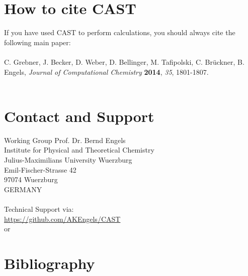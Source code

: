 \documentclass[10pt,a4paper]{article} %
\begin{document}
	\section{How to cite CAST}

	If you have used \ac{CAST} to perform calculations, you should always cite the following main paper:\\~\\
	C. Grebner, J. Becker, D. Weber, D. Bellinger, M. Tafipolski, C. Br\"uckner,
	B. Engels, \textit{Journal of Computational Chemistry} \textbf{2014}, \textit{35}, 1801-1807.~\\~\\
	

	\newpage
	\section{Contact and Support}
	\label{sec:contact}

	Working Group Prof. Dr. Bernd Engels\\
	Institute for Physical and Theoretical Chemistry\\
	Julius-Maximilians University Wuerzburg\\
	Emil-Fischer-Strasse 42\\
	97074 Wuerzburg\\
	GERMANY\\~\\
	Technical Support via:\\
	\url{https://github.com/AKEngels/CAST}\\
	or\\

\newpage
\section{Bibliography}
\printbibliography
\end{document}
